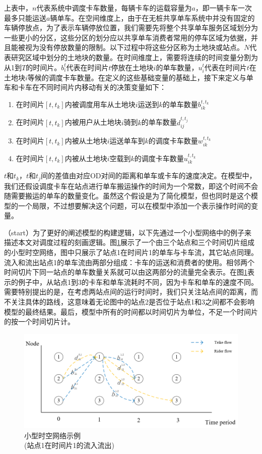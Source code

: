 \documentclass[]{tongjithesis}
\numberwithin{equation}{chapter}
\begin{document}
上表中，$n$代表系统中调度卡车数量，每辆卡车的运载容量为$a$，即一辆卡车一次最多只能运送$a$辆单车。在空间维度上，由于在无桩共享单车系统中并没有固定的车辆停放点，为了表示车辆停放位置，我们需要先将整个共享单车服务区域划分为一些更小的分区，这些分区的划分应以共享单车消费者常用的停车区域为依据，并且能被视为没有停放数量的限制。以下过程中将这些分区称为土地块或站点。$N$代表研究区域中划分的土地块的数量。在时间维度上，需要将连续的时间变量分割为从1到$T$的时间片。$b_i^t$代表在时间片$t$停放在土地块$i$的单车数量，$u_i^t$代表在时间片$t$在土地块$i$等候的调度卡车数量。在定义的这些基础变量的基础上，接下来定义与单车和卡车在不同时间片内移动有关的决策变量如下：
\begin{enumerate}
	\item 在时间片$[t,t_k]$内被调度用车从土地块$i$运送到$k$的单车数量$b_{ik}^{t,t_k}$
	\item 在时间片$[t,t_k]$内被用户从土地块$i$骑到$k$的单车数量$d_{ij}^{t,t_j}$
	\item 在时间片$[t,t_k]$内被从土地块$i$运送单车到$k$的调度卡车数量$w_{ik}^{t,t_k}$
	\item 在时间片$[t,t_k]$内被从土地块$i$空载到$k$的调度卡车数量$u_{ik}^{t,t_k}$
\end{enumerate}

$t$和$t_k$，$t$和$t_j$间的差值由对应OD对间的距离和单车或卡车的速度决定。在模型中，我们还假设调度卡车在站点进行单车搬运操作的时间为一个常数，即这个时间不会随需要搬运的单车的数量变化。虽然这个假设是为了简化模型，但也同时是这个模型的一个局限，不过想要解决这个问题，可以在模型中添加一个表示操作时间的变量。

（start）为了更好的阐述模型的构建逻辑，以下先通过一个小型网络中的例子来描述本文对调度过程的刻画逻辑。图\ref{network_example}展示了一个由三个站点和三个时间切片组成的小型时空网络，图中只展示了站点1在时间片1的单车与卡车流，其它站点同理。流入和流出站点1的单车流由两部分组成：卡车的运送和消费者的使用。相邻两个时间切片下同一站点的单车数量关系就可以由这两部分的流量完全表示。在图\ref{network_example}表示的例子中，从站点1到3的卡车和单车流耗时不同，因为卡车和单车的速度不同。需要特别提出的是，在考虑两站点间的运行时间时，我们只关注站点间的距离，而不关注具体的路线，这意味着无论图中的站点2是否位于站点1和3之间都不会影响模型的最终结果。最后，模型中所有的时间都以时间切片为单位，不足一个时间片的按一个时间切片计。
\begin{figure}[H]
	\centering
	\includegraphics[width=0.8 \textwidth]{figures_main/network_example.png}
	\caption{小型时空网络示例 \\
			 (站点1在时间片1的流入流出)
			}
	\label{network_example}
	\end{figure}
\end{document}
